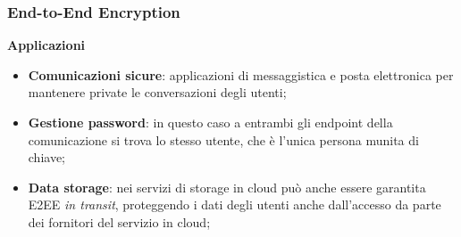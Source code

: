 \begin{frame}
    \frametitle{End-to-End Encryption}
    \textbf{Applicazioni}\newline

    \begin{itemize}
        \item \textbf{Comunicazioni sicure}: applicazioni di messaggistica e posta elettronica per mantenere private le conversazioni degli utenti;
        \item \textbf{Gestione password}: in questo caso a entrambi gli endpoint della comunicazione si trova lo stesso utente, che è l'unica persona munita di chiave;
        \item \textbf{Data storage}: nei servizi di storage in cloud può anche essere garantita E2EE \textit{in transit}, proteggendo i dati degli utenti anche dall'accesso da parte dei fornitori del servizio in cloud;
    \end{itemize}

\end{frame}